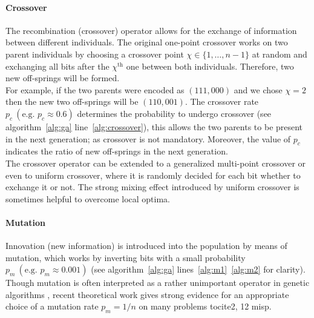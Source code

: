 \documentclass[12pt]{article}
\begin{document}
\paragraph{Crossover}
The recombination (crossover) operator allows for the
exchange of information between different individuals.
The original one-point crossover \cite{holland} works on two parent individuals
by choosing a crossover point $ \chi \in \{1, \dots, n-1 \} $
at random and exchanging all bits after the $ \chi^{\text{th}} $ one
between both individuals.
Therefore, two new off-springs will be formed.\\
For example, if the two parents were encoded as $(111, 000)$ and we chose $\chi = 2$
then the new two off-springs will be $(110, 001)$.
The crossover rate $ p_c \ (\text{e.g. } p_c \approx 0.6) $
determines the probability to undergo crossover (see algorithm~\ref{alg:ga} line~\ref{alg:crossover}),
this allows the two parents to be present in the next generation; as crossover is not mandatory.
Moreover, the value of $p_c$ indicates the ratio of new off-springs in the next generation.\\
The crossover operator can be extended to a generalized
multi-point crossover or even to uniform crossover,
where it is randomly decided for each bit
whether to exchange it or not.
The strong mixing effect introduced by uniform crossover
is sometimes helpful to overcome local optima.

\paragraph{Mutation}
Innovation (new information) is introduced into the
population by means of mutation, which works by inverting
bits with a small probability $p_m \ (\text{e.g. } p_m \approx 0.001)$
(see algorithm~\ref{alg:ga} lines~\ref{alg:m1}~\ref{alg:m2} for clarity).
Though mutation is often interpreted as a rather unimportant operator
in genetic algorithms \cite{holland}, recent theoretical
work gives strong evidence for an appropriate choice of a
mutation rate $ p_m = 1/n $ on many problems tocite{2, 12 misp}.
\end{document}
